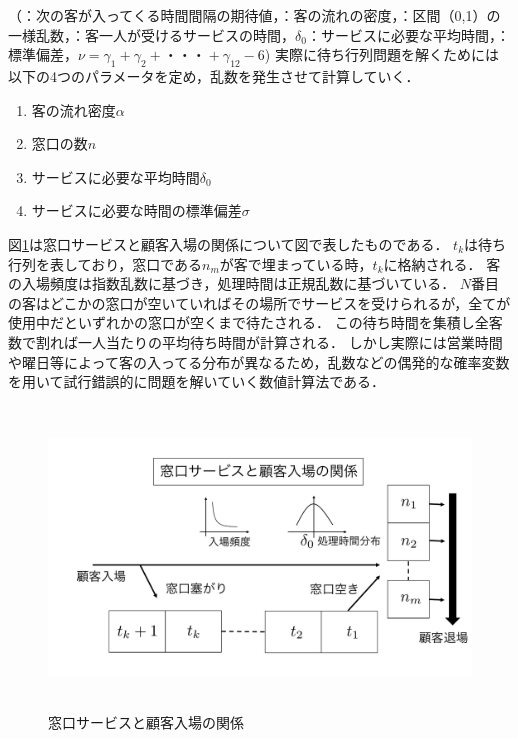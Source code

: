 \documentclass[12pt,a4j]{ltjsarticle}
\begin{document}
（\tau：次の客が入ってくる時間間隔の期待値，\alpha：客の流れの密度，\gamma：区間（0,1）の一様乱数，\delta：客一人が受けるサービスの時間，$\delta_0$：サービスに必要な平均時間，\sigma：標準偏差，$\nu=\gamma_1+\gamma_2+・・・+\gamma_{12}-6$)
実際に待ち行列問題を解くためには以下の4つのパラメータを定め，乱数を発生させて計算していく．

\begin{enumerate}[label=(\Roman*)]
	\item 客の流れ密度$\alpha$
　	\item 窓口の数$n$
　	\item サービスに必要な平均時間$\delta_0$
　	\item サービスに必要な時間の標準偏差$\sigma$
\end{enumerate} 

\clearpage

図\ref{fig:待ち行列概要}は窓口サービスと顧客入場の関係について図で表したものである．
$t_k$は待ち行列を表しており，窓口である$n_m$が客で埋まっている時，$t_k$に格納される．
客の入場頻度は指数乱数に基づき，処理時間は正規乱数に基づいている．
$N$番目の客はどこかの窓口が空いていればその場所でサービスを受けられるが，全てが使用中だといずれかの窓口が空くまで待たされる．
この待ち時間を集積し全客数で割れば一人当たりの平均待ち時間が計算される．
しかし実際には営業時間や曜日等によって客の入ってる分布が異なるため，乱数などの偶発的な確率変数を用いて試行錯誤的に問題を解いていく数値計算法である．

\vspace{5mm}
\begin{figure}[h]
\begin{center}
\includegraphics[height = 80mm  ] {figures/layout2.pdf}
\caption{窓口サービスと顧客入場の関係}
\label{fig:待ち行列概要}
\end{center}
\end{figure}
\end{document}
